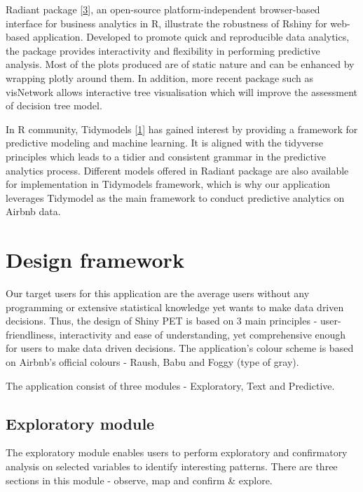\documentclass{acm_proc_article-sp}
\begin{document}
Radiant package {[}\protect\hyperlink{ref-radiant2019}{3}{]}, an
open-source platform-independent browser-based interface for business
analytics in R, illustrate the robustness of Rshiny for web-based
application. Developed to promote quick and reproducible data analytics,
the package provides interactivity and flexibility in performing
predictive analysis. Most of the plots produced are of static nature and
can be enhanced by wrapping plotly around them. In addition, more recent
package such as visNetwork allows interactive tree visualisation which
will improve the assessment of decision tree model.

In R community, Tidymodels
{[}\protect\hyperlink{ref-tidymodels2020}{1}{]} has gained interest by
providing a framework for predictive modeling and machine learning. It
is aligned with the tidyverse principles which leads to a tidier and
consistent grammar in the predictive analytics process. Different models
offered in Radiant package are also available for implementation in
Tidymodels framework, which is why our application leverages Tidymodel
as the main framework to conduct predictive analytics on Airbnb data.

\hypertarget{design-framework}{%
\section{Design framework}\label{design-framework}}

Our target users for this application are the average users without any
programming or extensive statistical knowledge yet wants to make data
driven decisions. Thus, the design of Shiny PET is based on 3 main
principles - user-friendliness, interactivity and ease of understanding,
yet comprehensive enough for users to make data driven decisions. The
application's colour scheme is based on Airbnb's official colours -
Raush, Babu and Foggy (type of gray).

The application consist of three modules - Exploratory, Text and
Predictive.

\hypertarget{exploratory-module}{%
\subsection{Exploratory module}\label{exploratory-module}}

The exploratory module enables users to perform exploratory and
confirmatory analysis on selected variables to identify interesting
patterns. There are three sections in this module - observe, map and
confirm \& explore.
\end{document}
